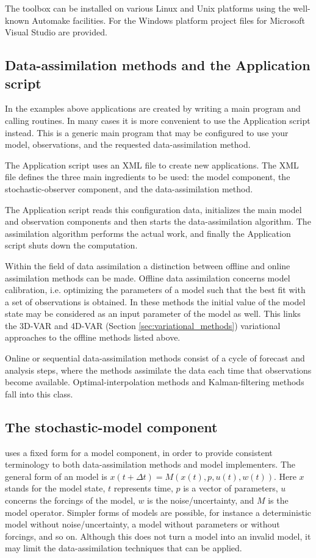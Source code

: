 The \oda toolbox can be installed on various Linux and Unix platforms using the well-known Automake facilities. For the Windows platform project files for Microsoft Visual Studio are provided.

\subsection{Data-assimilation methods and the \oda Application script}

In the examples above \oda applications are created by writing a main program and calling \oda routines. In many cases it is more convenient to use the \oda Application script instead. This is a generic main program that may be configured to use your model, observations, and the requested data-assimilation method.

The \oda Application script uses an XML file to create new \oda applications. The XML file defines the three main ingredients to be used: the \oda model component, the stochastic-observer component, and the data-assimilation method.

The \oda Application script reads this configuration data, initializes the main model and observation components and then starts the data-assimilation algorithm. The assimilation algorithm performs the actual work, and finally the Application script shuts down the computation.

Within the field of data assimilation a distinction between offline and online assimilation methods can be made. Offline data assimilation concerns model calibration, i.e. optimizing the parameters of a model such that the best fit with a set of observations is obtained. In these methods the initial value of the model state may be considered as an input parameter of the model as well. This links the 3D-VAR and 4D-VAR (Section \ref{sec:variational_methods}) variational approaches to the offline methods listed above.

Online or sequential data-assimilation methods consist of a cycle of forecast and analysis steps, where the methods assimilate the data each time that observations become available. Optimal-interpolation methods and Kalman-filtering methods fall into this class.

\subsection{The \oda stochastic-model component}

\oda uses a fixed form for a model component, in order to provide consistent terminology to both data-assimilation methods and model implementers. The general form of an \oda model is
$x(t+\Delta t) = M(x(t), p, u(t), w(t))$.
Here $x$ stands for the model state, $t$ represents time, $p$ is a vector of parameters, $u$ concerns the forcings of the model, $w$ is the noise/uncertainty, and $M$ is the model operator. Simpler forms of models are possible, for instance a deterministic model without noise/uncertainty, a model without parameters or without forcings, and so on. Although this does not turn a model into an invalid \oda model, it may limit the data-assimilation techniques that can be applied.

